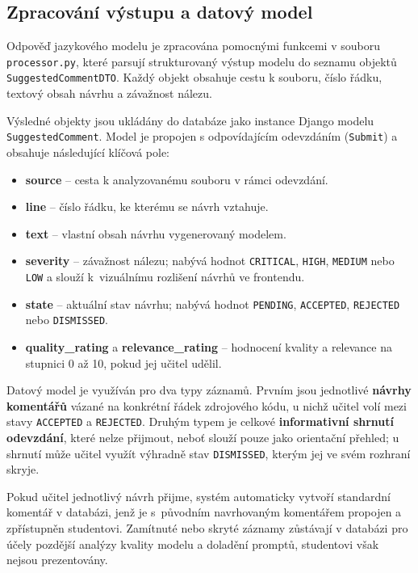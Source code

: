 \subsection{Zpracování výstupu a datový model}
\label{subsec:implementation-model}

Odpověď jazykového modelu je zpracována pomocnými funkcemi v souboru \texttt{processor.py}, které parsují strukturovaný výstup modelu do seznamu objektů \texttt{SuggestedCommentDTO}.
Každý objekt obsahuje cestu k souboru, číslo řádku, textový obsah návrhu a závažnost nálezu.

Výsledné objekty jsou ukládány do databáze jako instance Django modelu \texttt{SuggestedComment}.
Model je propojen s odpovídajícím odevzdáním (\texttt{Submit}) a obsahuje následující klíčová pole:

\begin{itemize}
    \item \textbf{source} -- cesta k analyzovanému souboru v rámci odevzdání.
    \item \textbf{line} -- číslo řádku, ke kterému se návrh vztahuje.
    \item \textbf{text} -- vlastní obsah návrhu vygenerovaný modelem.
    \item \textbf{severity} -- závažnost nálezu; nabývá hodnot \texttt{CRITICAL}, \texttt{HIGH}, \texttt{MEDIUM} nebo \texttt{LOW} a slouží k~vizuálnímu rozlišení návrhů ve frontendu.
    \item \textbf{state} -- aktuální stav návrhu; nabývá hodnot \texttt{PENDING}, \texttt{ACCEPTED}, \texttt{REJECTED} nebo \texttt{DISMISSED}.
    \item \textbf{quality\_rating} a \textbf{relevance\_rating} -- hodnocení kvality a relevance na stupnici 0 až 10, pokud jej učitel udělil.
\end{itemize}

Datový model je využíván pro dva typy záznamů.
Prvním jsou jednotlivé \textbf{návrhy komentářů} vázané na konkrétní řádek zdrojového kódu, u nichž učitel volí mezi stavy \texttt{ACCEPTED} a \texttt{REJECTED}.
Druhým typem je celkové \textbf{informativní shrnutí odevzdání}, které nelze přijmout, neboť slouží pouze jako orientační přehled; u shrnutí může učitel využít výhradně stav \texttt{DISMISSED}, kterým jej ve svém rozhraní skryje.

Pokud učitel jednotlivý návrh přijme, systém automaticky vytvoří standardní komentář v databázi, jenž je s~původním navrhovaným komentářem propojen a zpřístupněn studentovi.
Zamítnuté nebo skryté záznamy zůstávají v databázi pro účely pozdější analýzy kvality modelu a doladění promptů, studentovi však nejsou prezentovány.

\endinput
